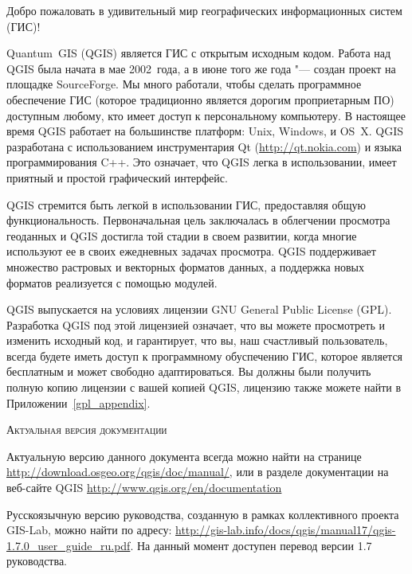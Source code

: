 \mainmatter
\pagestyle{scrheadings}
\label{label_forward}
\setcounter{page}{1}


Добро пожаловать в удивительный мир географических информационных систем
(ГИС)!

Quantum~GIS (QGIS) является ГИС с открытым исходным кодом. Работа
над QGIS была начата в мае 2002~года, а в июне того же года "--- создан
проект на площадке SourceForge. Мы много работали, чтобы сделать
программное обеспечение ГИС (которое традиционно является дорогим
проприетарным ПО) доступным любому, кто имеет
доступ к персональному компьютеру. В настоящее время QGIS работает на
большинстве платформ: Unix, Windows, и OS~X. QGIS разработана с
использованием инструментария Qt (\url{http://qt.nokia.com}) и языка
программирования C++. Это означает, что QGIS легка в использовании, имеет
приятный и простой графический интерфейс.

QGIS стремится быть легкой в использовании ГИС, предоставляя общую
функциональность. Первоначальная цель заключалась в облегчении
просмотра геоданных и QGIS достигла той стадии в своем развитии, когда
многие используют ее в своих ежедневных задачах просмотра.
QGIS поддерживает множество растровых и векторных форматов данных, а
поддержка новых форматов реализуется с помощью модулей.

QGIS выпускается на условиях лицензии GNU General Public License (GPL).
Разработка QGIS под этой лицензией означает, что вы можете просмотреть и
изменить исходный код, и гарантирует, что вы, наш счастливый
пользователь, всегда будете иметь доступ к программному обуспечению ГИС,
которое является бесплатным и может свободно адаптироваться. Вы должны
были получить полную копию лицензии с вашей копией QGIS, лицензию также
можете найти в Приложении~\ref{gpl_appendix}.

\begin{Tip}\caption{\textsc{Актуальная версия документации}}
Актуальную версию данного документа всегда можно найти на странице
\url{http://download.osgeo.org/qgis/doc/manual/}, или в разделе
документации на веб-сайте QGIS \url{http://www.qgis.org/en/documentation}
\end{Tip}

Русскоязычную версию руководства, созданную в рамках коллективного
проекта GIS-Lab, можно найти по адресу:
\url{http://gis-lab.info/docs/qgis/manual17/qgis-1.7.0_user_guide_ru.pdf}.
На данный момент доступен перевод версии 1.7 руководства.


